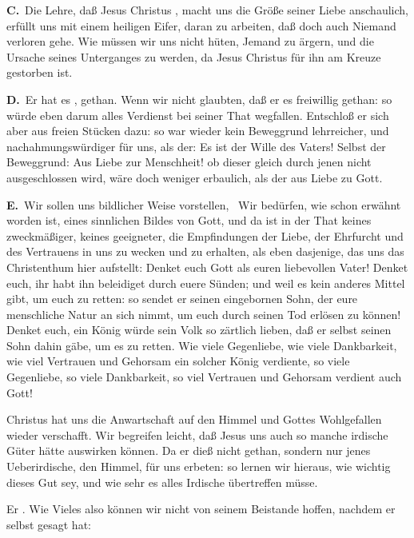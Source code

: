 \begin{aufza}
\vabst \textbf{C.}~Die Lehre, daß Jesus Christus , macht uns die Größe seiner Liebe anschaulich, erfüllt uns mit einem heiligen Eifer, daran zu arbeiten, daß doch auch Niemand verloren gehe. Wie müssen wir uns nicht hüten, Jemand zu ärgern, und die Ursache seines Unterganges zu werden, da Jesus Christus für ihn am Kreuze gestorben ist.~\par

\vabst \textbf{D.}~Er hat es , gethan. Wenn wir nicht glaubten, daß er es freiwillig gethan: so würde eben darum alles Verdienst bei seiner That wegfallen. Entschloß er sich aber aus freien Stücken dazu: so war wieder kein Beweggrund lehrreicher, und nachahmungswürdiger für uns, als der: Es ist der Wille des Vaters! Selbst der Beweggrund: Aus Liebe zur Menschheit! ob dieser gleich durch jenen nicht ausgeschlossen wird, wäre doch weniger erbaulich, als der aus Liebe zu Gott.\par

\vabst \textbf{E.}~Wir sollen uns bildlicher Weise vorstellen, \usw\ Wir bedürfen, wie schon erwähnt worden ist, eines sinnlichen Bildes von Gott, und da ist in der That keines zweckmäßiger, keines geeigneter, die Empfindungen der Liebe, der Ehrfurcht und des Vertrauens in uns zu wecken und zu erhalten, als eben dasjenige, das uns das Christenthum hier aufstellt: Denket euch Gott als euren liebevollen Vater! Denket euch, ihr habt ihn beleidiget durch euere Sünden; und weil es kein anderes Mittel gibt, um euch zu retten: so sendet er seinen eingebornen Sohn, der eure menschliche Natur an sich nimmt, um euch durch seinen Tod erlösen zu können! Denket euch, ein König würde sein Volk so zärtlich lieben, daß er selbst seinen Sohn dahin gäbe, um es zu retten. Wie viele Gegenliebe, wie viele Dankbarkeit, wie viel Vertrauen und Gehorsam ein solcher König verdiente, so viele Gegenliebe, so viele Dankbarkeit, so viel Vertrauen und Gehorsam verdient auch Gott!
\item Christus hat uns die Anwartschaft auf den Himmel und Gottes Wohlgefallen wieder verschafft. Wir begreifen leicht, daß Jesus uns auch so manche irdische Güter hätte auswirken können. Da er dieß nicht gethan, sondern nur jenes Ueberirdische, den Himmel, für uns erbeten: so lernen wir hieraus, wie wichtig dieses Gut sey, und wie sehr es alles Irdische übertreffen müsse.
\item Er . Wie Vieles also können wir nicht von seinem Beistande hoffen, nachdem er selbst gesagt hat: ~
\end{aufza}


